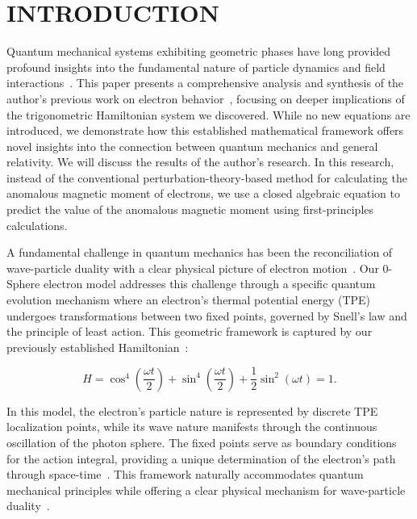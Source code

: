 \documentclass[%
 reprint,
 amsmath,amssymb,
 aps,
]{revtex4-1}
\numberwithin{equation}{section}%
\begin{document}
\maketitle


\section{\label{sec:INTRODUCTION}INTRODUCTION}

Quantum mechanical systems exhibiting geometric phases have long provided profound insights into the fundamental nature of particle dynamics and field interactions~\cite{berry1984, wilczek1984, bohm2003, aharonov1959}. This paper presents a comprehensive analysis and synthesis of the author's previous work on electron behavior~\cite{hanamura2018, hanamura2020, hanamura2023}, focusing on deeper implications of the trigonometric Hamiltonian system we discovered. While no new equations are introduced, we demonstrate how this established mathematical framework offers novel insights into the connection between quantum mechanics and general relativity. We will discuss the results of the author's research. In this research, instead of the conventional perturbation-theory-based method for calculating the anomalous magnetic moment of electrons, we use a closed algebraic equation to predict the value of the anomalous magnetic moment using first-principles calculations.

A fundamental challenge in quantum mechanics has been the reconciliation of wave-particle duality with a clear physical picture of electron motion~\cite{dirac1928, bjorken1965, holstein1990}. Our 0-Sphere electron model addresses this challenge through a specific quantum evolution mechanism where an electron's thermal potential energy (TPE) undergoes transformations between two fixed points, governed by Snell's law and the principle of least action. This geometric framework is captured by our previously established Hamiltonian~\cite{hanamura2018}:

\begin{equation}
    H = \cos^4\left(\frac{\omega t}{2}\right) + \sin^4\left(\frac{\omega t}{2}\right) + \frac{1}{2}\sin^2\left(\omega t\right) = 1.
    \label{eq:hamiltonian}
\end{equation}

In this model, the electron's particle nature is represented by discrete TPE localization points, while its wave nature manifests through the continuous oscillation of the photon sphere. The fixed points serve as boundary conditions for the action integral, providing a unique determination of the electron's path through space-time~\cite{misner1973}. This framework naturally accommodates quantum mechanical principles while offering a clear physical mechanism for wave-particle duality~\cite{weinberg1995}.
\end{document}
